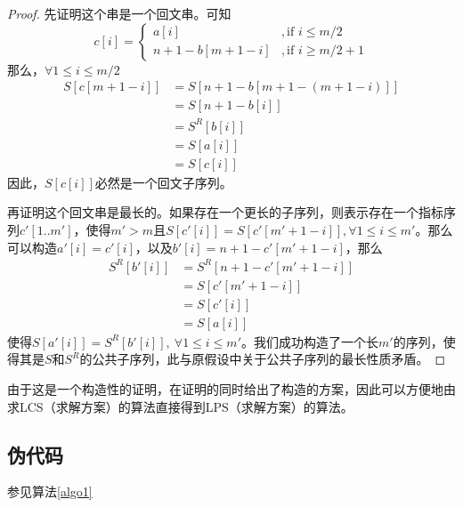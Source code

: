 \documentclass[UTF8]{ctexart}
\newtheorem*{proof}{证}[section]
\begin{document}
    \begin{proof}
        先证明这个串是一个回文串。可知
        \begin{equation*}
            c[i] = \begin{cases}
                a[i] &, \text{if $i \leq m/2$} \\
                n+1-b[m+1-i] &, \text{if $i \geq m/2+1$}
            \end{cases}
        \end{equation*}
        那么，$\forall 1 \leq i \leq m/2$
        \begin{align*}
            S[c[m+1-i]] 
            &=S[n+1-b[m+1-(m+1-i)]] \\
            &=S[n+1-b[i]]\\
            &=S^R[b[i]]\\
            &=S[a[i]]\\
            &=S[c[i]]
        \end{align*}
        因此，$S[c[i]]$必然是一个回文子序列。

        再证明这个回文串是最长的。如果存在一个更长的子序列，则表示存在一个指标序列$c'[1..m']$，使得$m'>m$且$S[c'[i]] = S[c'[m'+1-i]], \forall 1 \leq i \leq m'$。那么可以构造$a'[i] = c'[i]$，以及$b'[i] = n+1-c'[m'+1-i]$，那么
        \begin{align*}
            S^R[b'[i]]
            &=S^R[n+1-c'[m'+1-i]] \\
            &=S[c'[m'+1-i]] \\
            &=S[c'[i]] \\
            &=S[a[i]]
        \end{align*}
        使得$S[a'[i]]=S^R[b'[i]],\ \forall 1 \leq i \leq m'$。我们成功构造了一个长$m'$的序列，使得其是$S$和$S^R$的公共子序列，此与原假设中关于公共子序列的最长性质矛盾。
    \end{proof}

    由于这是一个构造性的证明，在证明的同时给出了构造的方案，因此可以方便地由求LCS（求解方案）的算法直接得到LPS（求解方案）的算法。

    \subsection*{伪代码}
    参见算法\ref{algo1}
\end{document}
